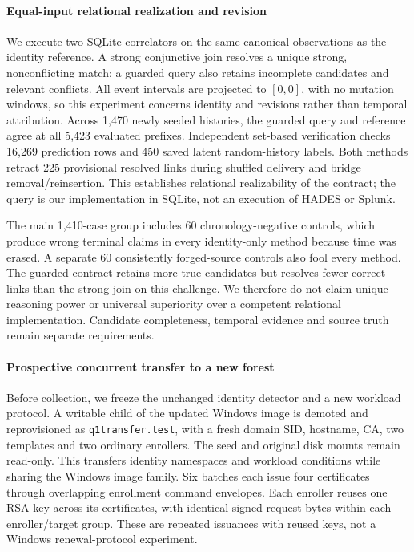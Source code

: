 \paragraph{Equal-input relational realization and revision}
We execute two SQLite correlators on the same canonical observations as the identity reference. A strong conjunctive join resolves a unique strong, nonconflicting match; a guarded query also retains incomplete candidates and relevant conflicts. All event intervals are projected to $[0,0]$, with no mutation windows, so this experiment concerns identity and revisions rather than temporal attribution. Across 1,470 newly seeded histories, the guarded query and reference agree at all 5,423 evaluated prefixes. Independent set-based verification checks 16,269 prediction rows and 450 saved latent random-history labels. Both methods retract 225 provisional resolved links during shuffled delivery and bridge removal/reinsertion. This establishes relational realizability of the contract; the query is our implementation in SQLite, not an execution of HADES or Splunk.



The main 1,410-case group includes 60 chronology-negative controls, which produce wrong terminal claims in every identity-only method because time was erased. A separate 60 consistently forged-source controls also fool every method. The guarded contract retains more true candidates but resolves fewer correct links than the strong join on this challenge. We therefore do not claim unique reasoning power or universal superiority over a competent relational implementation. Candidate completeness, temporal evidence and source truth remain separate requirements.

\paragraph{Prospective concurrent transfer to a new forest}
Before collection, we freeze the unchanged identity detector and a new workload protocol. A writable child of the updated Windows image is demoted and reprovisioned as \texttt{q1transfer.test}, with a fresh domain SID, hostname, CA, two templates and two ordinary enrollers. The seed and original disk mounts remain read-only. This transfers identity namespaces and workload conditions while sharing the Windows image family. Six batches each issue four certificates through overlapping enrollment command envelopes. Each enroller reuses one RSA key across its certificates, with identical signed request bytes within each enroller/target group. These are repeated issuances with reused keys, not a Windows renewal-protocol experiment.


